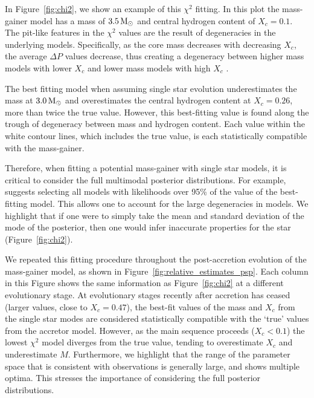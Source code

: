 \documentclass[desactivate]{aa}
\begin{document}
In Figure~\ref{fig:chi2}, we show an example of this $\chi^2$ fitting. In this plot the mass-gainer model has a mass of $3.5 \,{\rm M_\odot}$ and central hydrogen content of $X_c = 0.1$. %
The pit-like features in the $\chi^2$ values are the result of degeneracies in the underlying models. Specifically, as the core mass decreases with decreasing $X_c$, the average $\Delta P$ values decrease, thus creating a degeneracy between higher mass models with lower $X_c$ and lower mass models with high $X_c$ \citep[e.g., ][]{Buysschaert+2018:2018A&A...616A.148B, Mombarg2019}.

The best fitting model when assuming single star evolution underestimates the mass at $3.0 \,{\rm M_\odot}$ and overestimates the central hydrogen content at $X_c = 0.26$, more than twice the true value. However, this best-fitting value is found along the trough of degeneracy between mass and hydrogen content. Each value within the white contour lines, which includes the true value, is each statistically compatible with the mass-gainer.

Therefore, when fitting a potential mass-gainer with single star models, it is critical to consider the full multimodal posterior distributions. For example, \citealt{Basu+2012:2012ApJ...746...76B} suggests selecting all models with likelihoods over
95\% of the value of the best-fitting model. This allows one to account for the large degeneracies in models. We highlight that if one were to simply take the mean and standard deviation of the mode of the posterior, then one would infer inaccurate properties for the star (Figure~\ref{fig:chi2}).

We repeated this fitting procedure throughout the post-accretion evolution of the mass-gainer model, as shown in Figure~\ref{fig:relative_estimates_psp}. Each column in this Figure shows the same information as Figure~\ref{fig:chi2} at a different evolutionary stage. At evolutionary stages recently after accretion has ceased (larger values, close to $X_c = 0.47$), the best-fit values of the mass and $X_c$ from the single star modes are considered statistically compatible with the `true' values from the accretor model. However, as the main sequence proceeds ($X_c < 0.1$) the lowest $\chi^2$ model diverges from the true value, tending to overestimate $X_c$ and underestimate $M$. Furthermore, we highlight that the range of the parameter space that is consistent with observations is generally large, and shows multiple optima. This stresses the importance of considering the full posterior distributions.
\end{document}
